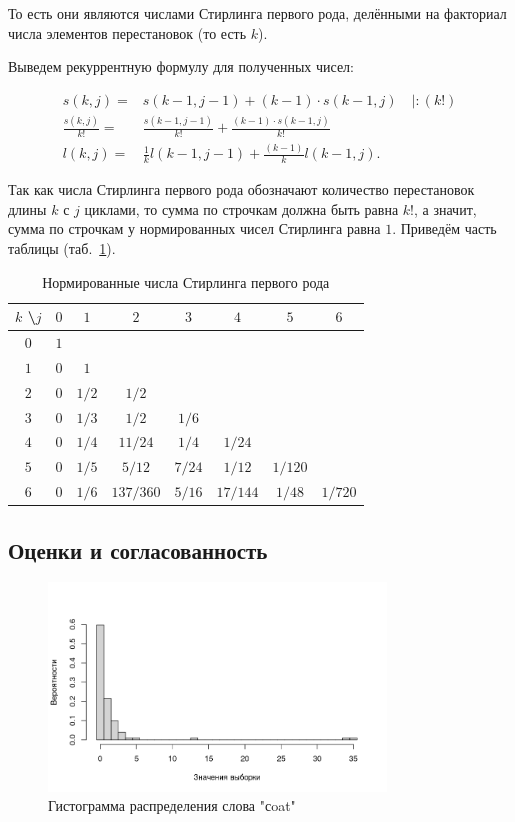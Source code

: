 \documentclass[12pt, specialist, subf, substylefile = spbu.rtx]{disser}
\begin{document}
	То есть они являются числами Стирлинга первого рода, делёнными на факториал числа элементов перестановок (то есть $ k $).
	
	Выведем рекуррентную формулу для полученных чисел:
	
	\[
		\begin{aligned}
			s(k, j) =& s(k - 1, j - 1) + (k - 1) \cdot s(k - 1, j) \quad | : (k!)\\
			\frac {s(k, j)} {k!} =& \frac {s(k - 1, j - 1)} {k !} + \frac {(k - 1) \cdot s(k - 1, j)} {k !}\\
			l(k, j) =& \frac {1} {k} l(k - 1, j - 1) + \frac {(k -1)} {k} l(k - 1, j).
		\end{aligned}
	\]
	
	Так как числа Стирлинга первого рода обозначают количество перестановок длины $k$ с $j$ циклами, то сумма по строчкам должна быть равна $k!$, а значит, сумма по строчкам у нормированных чисел Стирлинга равна $1$. Приведём часть таблицы (таб.~\ref{tab:normstirling1}).
	\begin{table}[!ht]
		\centering
		\caption{Нормированные числа Стирлинга первого рода}
		\begin{tabular}{c|ccccccc}
			$k$ \textbackslash $j$ & $0$ & $1$ & $2$ & $3$ & $4$ & $5$ & $6$\\ \hline
			$0$ & $1$ &  &  &  &  &  & \\
			$1$ & $0$ & $1$ &  &  &  &  & \\
			$2$ & $0$ & $1 / 2$ & $1 / 2$ &  &  &  & \\
			$3$ & $0$ & $1 / 3$ & $1 / 2$ & $1 / 6$ &  &  & \\
			$4$ & $0$ & $1 / 4$ & $11 / 24$ & $1 / 4$ & $1 / 24$ &  & \\
			$5$ & $0$ & $1 / 5$ & $5 / 12$ & $7 / 24$ & $1 / 12$ & $1 / 120$ & \\
			$6$ & $0$ & $1 / 6$ & $137 / 360$ & $5 / 16$ & $17 / 144$ & $1 / 48$ & $1 / 720$\\
		\end{tabular}
		\label{tab:normstirling1}
	\end{table}
	
	\subsection{Оценки и согласованность}
	
	\begin{figure}[ht]
		\centering
		\includegraphics[width = 0.8\textwidth]{coathist}
		\caption{Гистограмма распределения слова "сoat"}
		\label{img:coathist}
	\end{figure}
\end{document}
